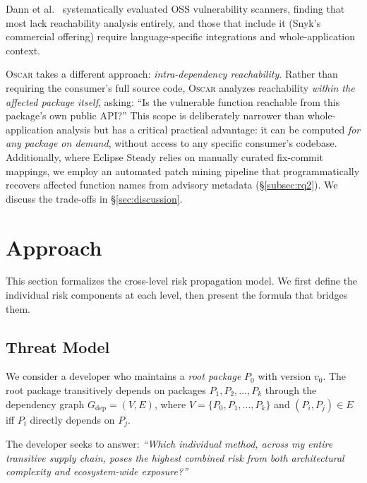 \documentclass[conference]{IEEEtran}
\begin{document}
Dann et al.~\cite{dann2021identifying} systematically evaluated OSS vulnerability scanners, finding that most lack reachability analysis entirely, and those that include it (Snyk's commercial offering) require language-specific integrations and whole-application context.

\textsc{Oscar} takes a different approach: \emph{intra-dependency reachability}. Rather than requiring the consumer's full source code, \textsc{Oscar} analyzes reachability \emph{within the affected package itself}, asking: ``Is the vulnerable function reachable from this package's own public API?'' This scope is deliberately narrower than whole-application analysis but has a critical practical advantage: it can be computed \emph{for any package on demand}, without access to any specific consumer's codebase. Additionally, where Eclipse Steady relies on manually curated fix-commit mappings, we employ an automated patch mining pipeline that programmatically recovers affected function names from advisory metadata (§\ref{subsec:rq2}). We discuss the trade-offs in §\ref{sec:discussion}.

\section{Approach}
\label{sec:approach}

This section formalizes the cross-level risk propagation model. We first define the individual risk components at each level, then present the formula that bridges them.

\subsection{Threat Model}
\label{subsec:threat-model}

We consider a developer who maintains a \emph{root package} $P_0$ with version $v_0$. The root package transitively depends on packages $P_1, P_2, \ldots, P_k$ through the dependency graph $G_{\mathrm{dep}} = (V, E)$, where $V = \{P_0, P_1, \ldots, P_k\}$ and $(P_i, P_j) \in E$ iff $P_i$ directly depends on $P_j$.

The developer seeks to answer: \emph{``Which individual method, across my entire transitive supply chain, poses the highest combined risk from both architectural complexity and ecosystem-wide exposure?''}
\end{document}
